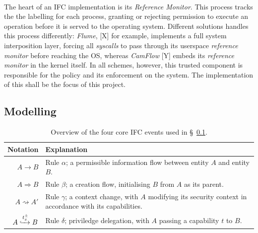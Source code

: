 \paragraph{} The heart of an IFC implementation is its \textit{Reference Monitor}. This process tracks the the labelling for each process, granting or rejecting permission to execute an operation before it is served to the operating system. Different solutions handles this process differently: \textit{Flume}, [X] for example, implements a full system interposition layer, forcing all \textit{syscalls} to pass through its userspace \textit{reference monitor} before reaching the OS, whereas \textit{CamFlow} [Y] embeds its \textit{reference monitor} in the kernel itself. In all schemes, however, this trusted component is responsible for the policy and its enforcement on the system. The implementation of this shall be the focus of this project.


\subsection{Modelling}
\label{sec:ifc-modelling}

\begin{table}
    \centering
    \newcommand\tableTop{\rule{0pt}{3ex}}
    \newcommand\tableMid{\rule{0pt}{3ex}}
    \newcommand\tableBottom{\rule[-2ex]{0pt}{0pt}}
    \begin{tabular}{r p{10cm}} 
        \hline
        Notation & Explanation \\ [0.1ex] 
        \hline
            \tableTop{$A \rightarrow B$} & \tableTop{Rule $\alpha$; a permissible information flow between entity $A$ and entity $B$.} \\
            
            $A \Rightarrow B$ & \tableMid{Rule $\beta$; a creation flow, initialising $B$ from $A$ as its parent.} \\

            $A \rightsquigarrow A'$ & \tableMid{Rule $\gamma$; a context change, with $A$ modifying its security context in accordance with its capabilities.} \\
            
            $A \xhookrightarrow[]{t^{\pm}_{x}} B$ & \tableMid{Rule $\delta$; priviledge delegation, with $A$ passing a capability $t$ to $B$.} \tableBottom \\
    \end{tabular}
    \caption{Overview of the four core IFC events used in §~\ref{sec:ifc-modelling}.}
    \label{table:ifc-notation}
\end{table}


